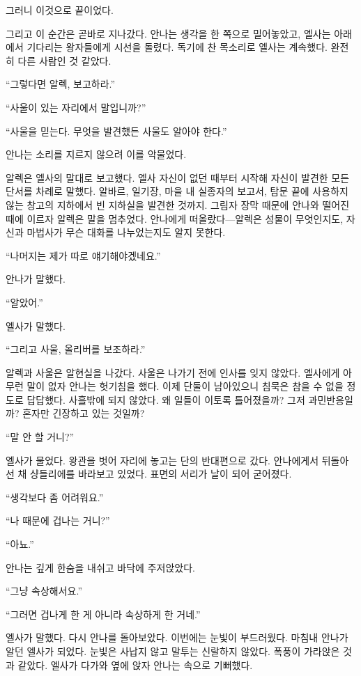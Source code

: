 그러니 이것으로 끝이었다.

그리고 이 순간은 곧바로 지나갔다. 안나는 생각을 한 쪽으로 밀어놓았고, 엘사는 아래에서 기다리는 왕자들에게 시선을 돌렸다. 독기에 찬 목소리로 엘사는 계속했다. 완전히 다른 사람인 것 같았다.

``그렇다면 알렉, 보고하라.''

``사울이 있는 자리에서 말입니까?''

``사울을 믿는다. 무엇을 발견했든 사울도 알아야 한다.''

안나는 소리를 지르지 않으려 이를 악물었다.

알렉은 엘사의 말대로 보고했다. 엘사 자신이 없던 때부터 시작해 자신이 발견한 모든 단서를 차례로 말했다. 알바르, 일기장, 마을 내 실종자의 보고서, 탐문 끝에 사용하지 않는 창고의 지하에서 빈 지하실을 발견한 것까지. 그림자 장막 때문에 안나와 떨어진 때에 이르자 알렉은 말을 멈추었다. 안나에게 떠올랐다—알렉은 성물이 무엇인지도, 자신과 마법사가 무슨 대화를 나누었는지도 알지 못한다.

``나머지는 제가 따로 얘기해야겠네요.''

안나가 말했다.

``알았어.''

엘사가 말했다.

``그리고 사울, 올리버를 보조하라.''

알렉과 사울은 알현실을 나갔다. 사울은 나가기 전에 인사를 잊지 않았다. 엘사에게 아무런 말이 없자 안나는 헛기침을 했다. 이제 단둘이 남아있으니 침묵은 참을 수 없을 정도로 답답했다. 사흘밖에 되지 않았다. 왜 일들이 이토록 틀어졌을까? 그저 과민반응일까? 혼자만 긴장하고 있는 것일까?

``말 안 할 거니?''

엘사가 물었다. 왕관을 벗어 자리에 놓고는 단의 반대편으로 갔다. 안나에게서 뒤돌아선 채 샹들리에를 바라보고 있었다. 표면의 서리가 날이 되어 굳어졌다.

``생각보다 좀 어려워요.''

``나 때문에 겁나는 거니?''

``아뇨.''

안나는 깊게 한숨을 내쉬고 바닥에 주저앉았다.

``그냥 속상해서요.''

``그러면 겁나게 한 게 아니라 속상하게 한 거네.''

엘사가 말했다. 다시 안나를 돌아보았다. 이번에는 눈빛이 부드러웠다. 마침내 안나가 알던 엘사가 되었다. 눈빛은 사납지 않고 말투는 신랄하지 않았다. 폭풍이 가라앉은 것과 같았다. 엘사가 다가와 옆에 앉자 안나는 속으로 기뻐했다.


